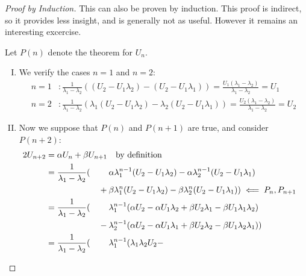 \begin{proof}[Proof by Induction]
 This can also be proven by induction. This proof is indirect, so it provides
 less insight, and is generally not as useful. However it remains an
 interesting excercise.

 Let \(P(n)\) denote the theorem for \(U_n\).
 \begin{enumerate}[I.]
  \item \label{basec_thm_fibo} We verify the cases \(n = 1\) and \(n = 2\):
        \begin{align*}
         n = 1&\colon \frac 1{\lambda_1 - \lambda_2}
                 ((U_2 - U_1 \lambda_2) - (U_2 - U_1 \lambda_1))
                = \frac {U_1(\lambda_1 - \lambda_2)}{\lambda_1 - \lambda_2}
                = U_1 \\
         n = 2&\colon \frac 1{\lambda_1 - \lambda_2}
                 (\lambda_1(U_2 - U_1 \lambda_2)
                - \lambda_2(U_2 - U_1 \lambda_1))
                = \frac {U_2(\lambda_1 - \lambda_2)}{\lambda_1 - \lambda_2}
                = U_2
        \end{align*}
  \item \label{induct_thm_fibo} Now we suppose that \(P(n)\) and \(P(n + 1)\)
        are true, and consider \(P(n + 2)\):
        \begin{alignat*}2
         U_{n + 2} &= \mathrlap{\alpha U_n + \beta U_{n + 1}
                      \quad \text{by definition}} \\
                   &= \frac 1{\lambda_1 - \lambda_2}(
                     &&\alpha\lambda_1^{n - 1}(U_2 - U_1 \lambda_2)
                     - \alpha\lambda_2^{n - 1}(U_2 - U_1 \lambda_1) \\
              &&{}+{}& \beta\lambda_1^n(U_2 - U_1 \lambda_2)
                     - \beta\lambda_2^n(U_2 - U_1 \lambda_1))
                       \impliedby P_n, P_{n + 1} \\
                   &= \frac 1{\lambda_1 - \lambda_2}(
                     &&\lambda_1^{n - 1}(
                        \alpha U_2 - \alpha U_1 \lambda_2 +
                        \beta U_2 \lambda_1 - \beta U_1 \lambda_1 \lambda_2) \\
              &&{}-{}& \lambda_2^{n - 1}(
                        \alpha U_2 - \alpha U_1 \lambda_1 +
                        \beta U_2 \lambda_2 - \beta U_1 \lambda_2 \lambda_1)
                      ) \\
                   &= \frac 1{\lambda_1 - \lambda_2}(
                     &&\lambda_1^{n - 1}(
                        \lambda_1 \lambda_2 U_2 -

\end{alignat*}
\end{enumerate}
\end{proof}

